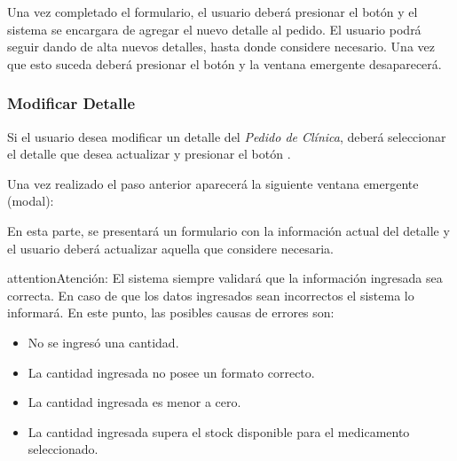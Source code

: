 \documentclass[a4paper,10pt,spanish]{sphinxmanual}
\begin{document}
Una vez completado el formulario, el usuario deberá presionar el botón  y el sistema se encargara de agregar el nuevo detalle al pedido.
El usuario podrá seguir dando de alta nuevos detalles, hasta donde considere necesario. Una vez que esto suceda deberá presionar el botón  y la ventana emergente desaparecerá.


\subsubsection{Modificar Detalle}
\label{pedidosclinica:modificar-detalle-pc}\label{pedidosclinica:modificar-detalle}
Si el usuario desea modificar un detalle del \emph{Pedido de Clínica}, deberá seleccionar el detalle que desea actualizar y presionar el botón .


Una vez realizado el paso anterior aparecerá la siguiente ventana emergente (modal):


En esta parte, se presentará un formulario con la información actual del detalle y el usuario deberá actualizar aquella que considere necesaria.

\begin{notice}{attention}{Atención:}
El sistema siempre validará que la información ingresada sea correcta. En caso de que los datos ingresados sean incorrectos el sistema lo informará.
En este punto, las posibles causas de errores son:
\begin{itemize}
\item {} 
No se ingresó una cantidad.

\item {} 
La cantidad ingresada no posee un formato correcto.

\item {} 
La cantidad ingresada es menor a cero.

\item {} 
La cantidad ingresada supera el stock disponible para el medicamento seleccionado.

\end{itemize}
\end{notice}
\end{document}
